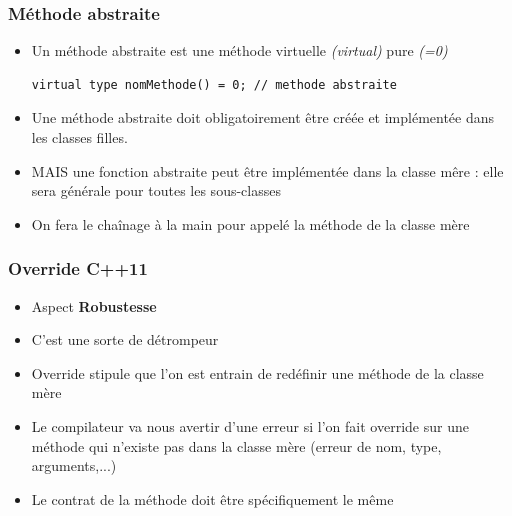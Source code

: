 \documentclass[12pt,a4paper]{article}
\begin{document}
\subsubsection{Méthode abstraite}
\begin{itemize}
\item Un méthode abstraite est une méthode virtuelle \textit{(virtual)} pure \textit{(=0)}
\begin{lstlisting}
virtual type nomMethode() = 0; // methode abstraite
\end{lstlisting}
\item Une méthode abstraite doit obligatoirement être créée et implémentée dans les classes filles.
\item MAIS une fonction abstraite peut être implémentée dans la classe mêre : elle sera générale pour toutes les sous-classes
\item On fera le chaînage à la main pour appelé la méthode de la classe mère
\end{itemize}
\subsubsection{Override C++11}
\begin{itemize}
\item Aspect \textbf{Robustesse}
\item C'est une sorte de détrompeur
\item Override stipule que l'on est entrain de redéfinir une méthode de la classe mère
\item Le compilateur va nous avertir d'une erreur si l'on fait override sur une méthode qui n'existe pas dans la classe mère (erreur de nom, type, arguments,...)
\item Le contrat de la méthode doit être spécifiquement le même
\end{itemize}
\end{document}
